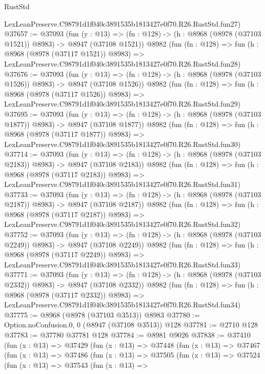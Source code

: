 \begin{lexlean}{RustStd}
\begin{coremodule}
    LexLeanPreserve.C98791d1f040c3891535b1813427e0f70.R26.RustStd.fun27)
@37657 := @37093
    (fun (y : @13) =>
    (fn : @128) -> (h : @8968 (@8978 (@37103 @1521)) @8983) -> @8947 (@37108 @1521))
    @8982
    (fun (fn : @128) =>
    fun (h : @8968 (@8978 (@37117 @1521)) @8983) =>
    LexLeanPreserve.C98791d1f040c3891535b1813427e0f70.R26.RustStd.fun28)
@37676 := @37093
    (fun (y : @13) =>
    (fn : @128) -> (h : @8968 (@8978 (@37103 @1526)) @8983) -> @8947 (@37108 @1526))
    @8982
    (fun (fn : @128) =>
    fun (h : @8968 (@8978 (@37117 @1526)) @8983) =>
    LexLeanPreserve.C98791d1f040c3891535b1813427e0f70.R26.RustStd.fun29)
@37695 := @37093
    (fun (y : @13) =>
    (fn : @128) -> (h : @8968 (@8978 (@37103 @1877)) @8983) -> @8947 (@37108 @1877))
    @8982
    (fun (fn : @128) =>
    fun (h : @8968 (@8978 (@37117 @1877)) @8983) =>
    LexLeanPreserve.C98791d1f040c3891535b1813427e0f70.R26.RustStd.fun30)
@37714 := @37093
    (fun (y : @13) =>
    (fn : @128) -> (h : @8968 (@8978 (@37103 @2183)) @8983) -> @8947 (@37108 @2183))
    @8982
    (fun (fn : @128) =>
    fun (h : @8968 (@8978 (@37117 @2183)) @8983) =>
    LexLeanPreserve.C98791d1f040c3891535b1813427e0f70.R26.RustStd.fun31)
@37733 := @37093
    (fun (y : @13) =>
    (fn : @128) -> (h : @8968 (@8978 (@37103 @2187)) @8983) -> @8947 (@37108 @2187))
    @8982
    (fun (fn : @128) =>
    fun (h : @8968 (@8978 (@37117 @2187)) @8983) =>
    LexLeanPreserve.C98791d1f040c3891535b1813427e0f70.R26.RustStd.fun32)
@37752 := @37093
    (fun (y : @13) =>
    (fn : @128) -> (h : @8968 (@8978 (@37103 @2249)) @8983) -> @8947 (@37108 @2249))
    @8982
    (fun (fn : @128) =>
    fun (h : @8968 (@8978 (@37117 @2249)) @8983) =>
    LexLeanPreserve.C98791d1f040c3891535b1813427e0f70.R26.RustStd.fun33)
@37771 := @37093
    (fun (y : @13) =>
    (fn : @128) -> (h : @8968 (@8978 (@37103 @2332)) @8983) -> @8947 (@37108 @2332))
    @8982
    (fun (fn : @128) =>
    fun (h : @8968 (@8978 (@37117 @2332)) @8983) =>
    LexLeanPreserve.C98791d1f040c3891535b1813427e0f70.R26.RustStd.fun34)
@37775 := @8968 (@8978 (@37103 @3513)) @8983
@37780 := Option.noConfusion.{0, 0} (@8947 (@37108 @3513)) @128
@37781 := @2710 @128
@37783 := @37780 @37781 @128
@37784 := @8981 @9026
@37838 := @37410
    (fun (x : @13) =>
    @37429
      (fun (x : @13) =>
      @37448
        (fun (x : @13) =>
        @37467
          (fun (x : @13) =>
          @37486
            (fun (x : @13) =>
            @37505
              (fun (x : @13) =>
              @37524
                (fun (x : @13) =>
                @37543
                  (fun (x : @13) =>

\end{coremodule}
\end{lexlean}
